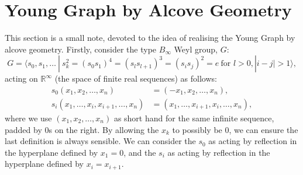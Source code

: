 \documentclass{article}
\theoremstyle{definition}
\def\R{\mathbb{R}}
\numberwithin{equation}{subsection}
\begin{document}
{{\section{Young Graph by Alcove Geometry}
This section is a small note, devoted to the idea of realising the Young Graph by alcove geometry. Firstly, consider the type $B_{\infty}$ Weyl group, $G$:
\[ G=\langle s_0, s_1,\dots \ | \ s_k^2=(s_0 s_1)^4=(s_{l}s_{l+1})^3=(s_i s_j)^2=e \ \text{for }l>0, |i-j|>1 \rangle,\]
acting on $\R^\infty$ (the space of finite real sequences) as follows:
\begin{align*}
    s_0(x_1,x_2,\dots,x_n)&=(-x_1,x_2,\dots,x_n),\\
    s_i(x_1,\dots,x_i,x_{i+1},\dots,x_n)&=(x_1,\dots,x_{i+1},x_i,\dots,x_n),
\end{align*}
where we use $(x_1,x_2,\dots,x_n)$ as short hand for the same infinite sequence, padded by 0s on the right. By allowing the $x_k$ to possibly be 0, we can ensure the last definition is always sensible. We can consider the $s_0$ as acting by reflection in the hyperplane defined by $x_1=0$, and the $s_i$ as acting by reflection in the hyperplane defined by $x_i=x_{i+1}$.

}}
\end{document}

